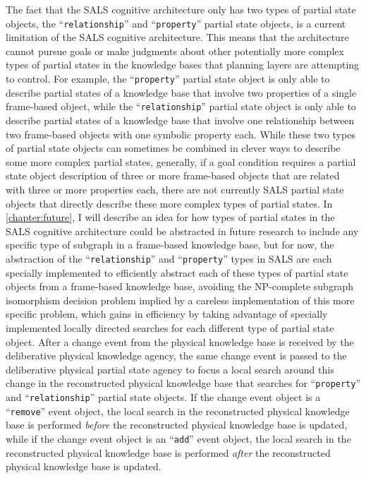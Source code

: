The fact that the SALS cognitive architecture only has two types of
partial state objects, the ``{\tt{relationship}}'' and
``{\tt{property}}'' partial state objects, is a current limitation of
the SALS cognitive architecture.  This means that the architecture
cannot pursue goals or make judgments about other potentially more
complex types of partial states in the knowledge bases that planning
layers are attempting to control.  For example, the
``{\tt{property}}'' partial state object is only able to describe
partial states of a knowledge base that involve two properties of a
single frame-based object, while the ``{\tt{relationship}}'' partial
state object is only able to describe partial states of a knowledge
base that involve one relationship between two frame-based objects
with one symbolic property each.  While these two types of partial
state objects can sometimes be combined in clever ways to describe
some more complex partial states, generally, if a goal condition
requires a partial state object description of three or more
frame-based objects that are related with three or more properties
each, there are not currently SALS partial state objects that directly
describe these more complex types of partial states.  In
{\mbox{\autoref{chapter:future}}}, I will describe an idea for how
types of partial states in the SALS cognitive architecture could be
abstracted in future research to include any specific type of subgraph
in a frame-based knowledge base, but for now, the abstraction of the
``{\tt{relationship}}'' and ``{\tt{property}}'' types in SALS are each
specially implemented to efficiently abstract each of these types of
partial state objects from a frame-based knowledge base, avoiding the
NP-complete subgraph isomorphism decision problem
\cite[]{messmer:1995,messmer:2000} implied by a careless
implementation of this more specific problem, which gains in
efficiency by taking advantage of specially implemented locally
directed searches for each different type of partial state object.
After a change event from the physical knowledge base is received by
the deliberative physical knowledge agency, the same change event is
passed to the deliberative physical partial state agency to focus a
local search around this change in the reconstructed physical
knowledge base that searches for ``{\tt{property}}'' and
``{\tt{relationship}}'' partial state objects.  If the change event
object is a ``{\tt{remove}}'' event object, the local search in the
reconstructed physical knowledge base is performed \emph{before} the
reconstructed physical knowledge base is updated, while if the change
event object is an ``{\tt{add}}'' event object, the local search in
the reconstructed physical knowledge base is performed \emph{after}
the reconstructed physical knowledge base is updated.

